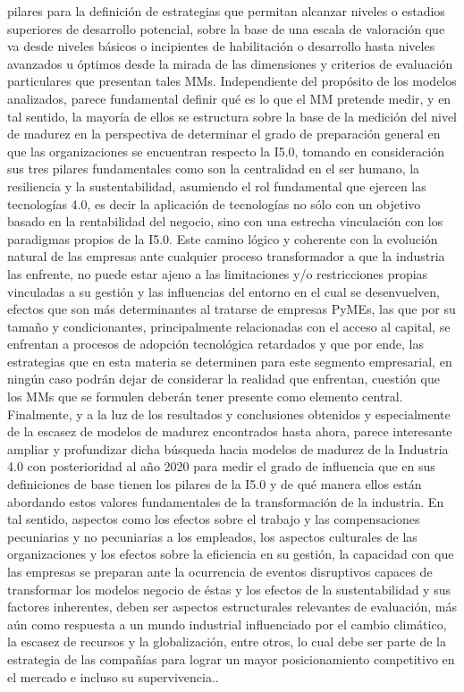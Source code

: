 \documentclass{article}
\begin{document}
pilares para la definición de estrategias que permitan alcanzar niveles
o estadios superiores de desarrollo potencial, sobre la base de una
escala de valoración que va desde niveles básicos o incipientes de
habilitación o desarrollo hasta niveles avanzados u óptimos desde la
mirada de las dimensiones y criterios de evaluación particulares que
presentan tales MMs. Independiente del propósito de los modelos
analizados, parece fundamental definir qué es lo que el MM pretende
medir, y en tal sentido, la mayoría de ellos se estructura sobre la base
de la medición del nivel de madurez en la perspectiva de determinar el
grado de preparación general en que las organizaciones se encuentran
respecto la I5.0, tomando en consideración sus tres pilares
fundamentales como son la centralidad en el ser humano, la resiliencia y
la sustentabilidad, asumiendo el rol fundamental que ejercen las
tecnologías 4.0, es decir la aplicación de tecnologías no sólo con un
objetivo basado en la rentabilidad del negocio, sino con una estrecha
vinculación con los paradigmas propios de la I5.0. Este camino lógico y
coherente con la evolución natural de las empresas ante cualquier
proceso transformador a que la industria las enfrente, no puede estar
ajeno a las limitaciones y/o restricciones propias vinculadas a su
gestión y las influencias del entorno en el cual se desenvuelven,
efectos que son más determinantes al tratarse de empresas PyMEs, las que
por su tamaño y condicionantes, principalmente relacionadas con el
acceso al capital, se enfrentan a procesos de adopción tecnológica
retardados y que por ende, las estrategias que en esta materia se
determinen para este segmento empresarial, en ningún caso podrán dejar
de considerar la realidad que enfrentan, cuestión que los MMs que se
formulen deberán tener presente como elemento central. Finalmente, y a
la luz de los resultados y conclusiones obtenidos y especialmente de la
escasez de modelos de madurez encontrados hasta ahora, parece
interesante ampliar y profundizar dicha búsqueda hacia modelos de
madurez de la Industria 4.0 con posterioridad al año 2020 para medir el
grado de influencia que en sus definiciones de base tienen los pilares
de la I5.0 y de qué manera ellos están abordando estos valores
fundamentales de la transformación de la industria. En tal sentido,
aspectos como los efectos sobre el trabajo y las compensaciones
pecuniarias y no pecuniarias a los empleados, los aspectos culturales de
las organizaciones y los efectos sobre la eficiencia en su gestión, la
capacidad con que las empresas se preparan ante la ocurrencia de eventos
disruptivos capaces de transformar los modelos negocio de éstas y los
efectos de la sustentabilidad y sus factores inherentes, deben ser
aspectos estructurales relevantes de evaluación, más aún como respuesta
a un mundo industrial influenciado por el cambio climático, la escasez
de recursos y la globalización, entre otros, lo cual debe ser parte de
la estrategia de las compañías para lograr un mayor posicionamiento
competitivo en el mercado e incluso su supervivencia..
\end{document}
